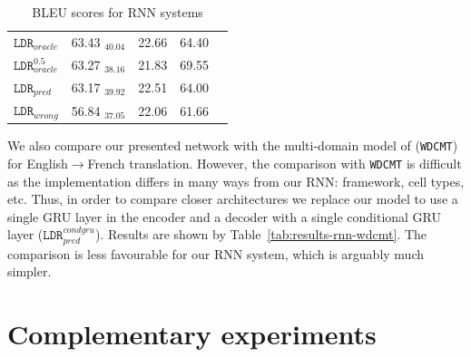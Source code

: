 \documentclass[a4paper]{article}
\begin{document}
\begin{table}[!h]
\begin{center}
{\begin{tabular}{|l|ccc|c|}
\hline
$\mathtt{LDR}_{oracle}$     & 63.43 $_{40.04}$ & 22.66 & 64.40 & \\
$\mathtt{LDR}_{oracle}^{0.5}$   & 63.27 $_{38.16}$ & 21.83 & 69.55 & \\
$\mathtt{LDR}_{pred}$        & 63.17 $_{39.92}$ & 22.51 & 64.00 & \\
$\mathtt{LDR}_{wrong}$     & 56.84 $_{37.05}$ & 22.06 & 61.66 & \\
\hline
\end{tabular}
} %
\end{center}
\caption{BLEU scores for RNN systems\label{tab:results-rnn}}
\end{table}

We also compare our presented network with the multi-domain model of \cite{Zeng18multidomain} (\texttt{WDCMT}) for English$\rightarrow$French translation.
However, the comparison with \texttt{WDCMT} is difficult as the implementation differs in many ways from our RNN: framework, cell types,  etc.
Thus, in order to compare closer architectures we replace our model to use a single GRU layer in the encoder and a decoder with a single conditional GRU layer ($\mathtt{LDR}_{pred}^{condgru}$).
Results are shown by Table~\ref{tab:results-rnn-wdcmt}.
The comparison is less favourable for our RNN system, which is arguably much simpler.

\begin{table}[!h]
\begin{center}
\end{center}
\caption{BLEU scores for RNN systems. Comparison between a version of $\texttt{LDR}_{pred}$ using conditional GRUs and \texttt{WDCMT}.\label{tab:results-rnn-wdcmt}}
\end{table}

\section{Complementary experiments\label{sec:Discussion}}
\end{document}
